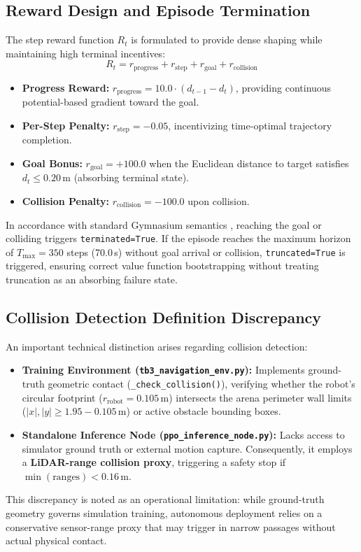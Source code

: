 \documentclass[conference]{IEEEtran}
\begin{document}
\subsection{Reward Design and Episode Termination}
The step reward function $R_t$ is formulated to provide dense shaping while maintaining high terminal incentives:
\begin{equation}
R_t = r_{\text{progress}} + r_{\text{step}} + r_{\text{goal}} + r_{\text{collision}}
\end{equation}
\begin{itemize}
    \item \textbf{Progress Reward:} $r_{\text{progress}} = 10.0 \cdot (d_{t-1} - d_t)$, providing continuous potential-based gradient toward the goal.
    \item \textbf{Per-Step Penalty:} $r_{\text{step}} = -0.05$, incentivizing time-optimal trajectory completion.
    \item \textbf{Goal Bonus:} $r_{\text{goal}} = +100.0$ when the Euclidean distance to target satisfies $d_t \le 0.20\,\text{m}$ (absorbing terminal state).
    \item \textbf{Collision Penalty:} $r_{\text{collision}} = -100.0$ upon collision.
\end{itemize}
In accordance with standard Gymnasium semantics \cite{towers2023gymnasium}, reaching the goal or colliding triggers \texttt{terminated=True}. If the episode reaches the maximum horizon of $T_{\max} = 350$ steps (70.0\,s) without goal arrival or collision, \texttt{truncated=True} is triggered, ensuring correct value function bootstrapping without treating truncation as an absorbing failure state.

\subsection{Collision Detection Definition Discrepancy}
An important technical distinction arises regarding collision detection:
\begin{itemize}
    \item \textbf{Training Environment (\texttt{tb3\_navigation\_env.py}):} Implements ground-truth geometric contact (\texttt{\_check\_collision()}), verifying whether the robot's circular footprint ($r_{\text{robot}} = 0.105\,\text{m}$) intersects the arena perimeter wall limits ($|x|, |y| \ge 1.95 - 0.105\,\text{m}$) or active obstacle bounding boxes.
    \item \textbf{Standalone Inference Node (\texttt{ppo\_inference\_node.py}):} Lacks access to simulator ground truth or external motion capture. Consequently, it employs a \textbf{LiDAR-range collision proxy}, triggering a safety stop if $\min(\text{ranges}) < 0.16\,\text{m}$.
\end{itemize}
This discrepancy is noted as an operational limitation: while ground-truth geometry governs simulation training, autonomous deployment relies on a conservative sensor-range proxy that may trigger in narrow passages without actual physical contact.
\end{document}
